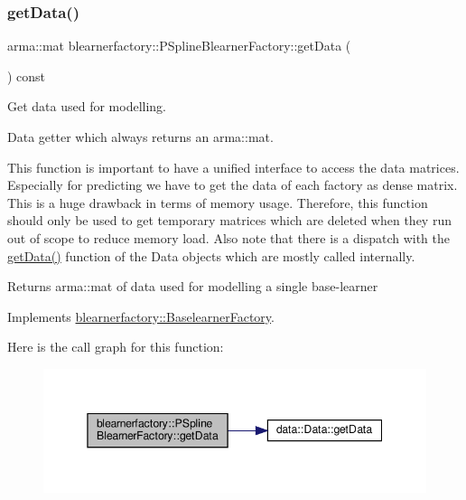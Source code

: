 \subsubsection{\texorpdfstring{get\+Data()}{getData()}}
{\footnotesize\ttfamily arma\+::mat blearnerfactory\+::\+P\+Spline\+Blearner\+Factory\+::get\+Data (\begin{DoxyParamCaption}{ }\end{DoxyParamCaption}) const\hspace{0.3cm}{\ttfamily [virtual]}}



Get data used for modelling. 

Data getter which always returns an arma\+::mat.

This function is important to have a unified interface to access the data matrices. Especially for predicting we have to get the data of each factory as dense matrix. This is a huge drawback in terms of memory usage. Therefore, this function should only be used to get temporary matrices which are deleted when they run out of scope to reduce memory load. Also note that there is a dispatch with the \hyperlink{classblearnerfactory_1_1_p_spline_blearner_factory_a9363131f08b3b3c1c482786347d13f7c}{get\+Data()} function of the Data objects which are mostly called internally.

\begin{DoxyReturn}{Returns}
{\ttfamily arma\+::mat} of data used for modelling a single base-\/learner 
\end{DoxyReturn}


Implements \hyperlink{classblearnerfactory_1_1_baselearner_factory_aa3e4580bca870ca3b742dda6c820e1e6}{blearnerfactory\+::\+Baselearner\+Factory}.

Here is the call graph for this function\+:\nopagebreak
\begin{figure}[H]
\begin{center}
\leavevmode
\includegraphics[width=345pt]{classblearnerfactory_1_1_p_spline_blearner_factory_a9363131f08b3b3c1c482786347d13f7c_cgraph}
\end{center}
\end{figure}
\mbox{\label{classblearnerfactory_1_1_p_spline_blearner_factory_a290a1c60224d027059939a895b474aa1}} 
